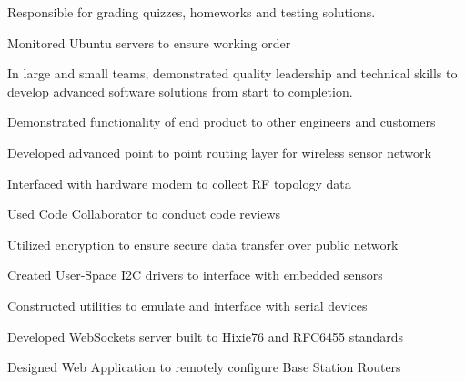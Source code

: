 \documentclass[letterpaper]{deedy-resume} %
\begin{document}
\begin{minipage}[t]{0.66\textwidth}
\vspace{\topsep} %
\begin{tightitemize}
\item Responsible for grading quizzes, homeworks and testing solutions.
\item Monitored Ubuntu servers to ensure working order
\end{tightitemize}

\sectionspace %



\vspace{\topsep} %
In large and small teams, demonstrated quality leadership and technical skills to develop advanced
software solutions from start to completion.
\vspace{\topsep} %
\vspace{\topsep} %
\begin{tightitemize}
\item Demonstrated functionality of end product to other engineers and customers
\item Developed advanced point to point routing layer for wireless sensor network
\item Interfaced with hardware modem to collect RF topology data
\item Used Code Collaborator to conduct code reviews
\item Utilized encryption to ensure secure data transfer over public network
\item Created User-Space I2C drivers to interface with embedded sensors
\item Constructed utilities to emulate and interface with serial devices
\item Developed WebSockets server built to Hixie76 and RFC6455 standards
\item Designed Web Application to remotely configure Base Station Routers
\end{tightitemize}

\sectionspace %
\sectionspace %



\end{minipage}
\end{document}
